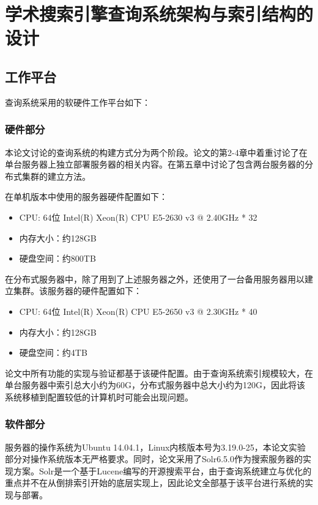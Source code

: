 
\chapter{学术搜索引擎查询系统架构与索引结构的设计}
\label{chap:c2}
\section{工作平台}
    查询系统采用的软硬件工作平台如下：
    \subsection{硬件部分}
        本论文讨论的查询系统的构建方式分为两个阶段。论文的第2-4章中着重讨论了在单台服务器上独立部署服务器的相关内容。在第五章中讨论了包含两台服务器的分布式集群的建立方法。
        
        在单机版本中使用的服务器硬件配置如下：
        \begin{itemize}
        \item CPU: 64位 Intel(R) Xeon(R) CPU E5-2630 v3 @ 2.40GHz * 32
        \item 内存大小：约128GB
        \item 硬盘空间：约800TB
        \end{itemize}
        在分布式服务器中，除了用到了上述服务器之外，还使用了一台备用服务器用以建立集群。该服务器的硬件配置如下：
        \begin{itemize}
        \item CPU: 64位 Intel(R) Xeon(R) CPU E5-2650 v3 @ 2.30GHz * 40
        \item 内存大小：约128GB
        \item 硬盘空间：约4TB
        \end{itemize}
        论文中所有功能的实现与验证都基于该硬件配置。由于查询系统索引规模较大，在单台服务器中索引总大小约为60G，分布式服务器中总大小约为120G，因此将该系统移植到配置较低的计算机时可能会出现问题。
    \subsection{软件部分}
        服务器的操作系统为Ubuntu 14.04.1，Linux内核版本号为3.19.0-25，本论文实验部分对操作系统版本无严格要求。同时，论文采用了Solr6.5.0作为搜索服务器的实现方案。Solr是一个基于Lucene编写的开源搜索平台，由于查询系统建立与优化的重点并不在从倒排索引开始的底层实现上，因此论文全部基于该平台进行系统的实现与部署。

